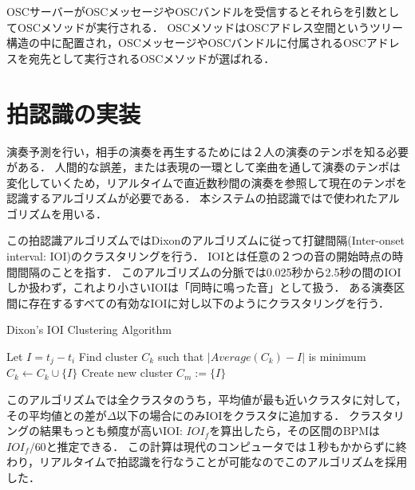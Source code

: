 OSCサーバーがOSCメッセージやOSCバンドルを受信するとそれらを引数としてOSCメソッドが実行される．
OSCメソッドはOSCアドレス空間というツリー構造の中に配置され，OSCメッセージやOSCバンドルに付属されるOSCアドレスを宛先として実行されるOSCメソッドが選ばれる．

\section{拍認識の実装}
演奏予測を行い，相手の演奏を再生するためには２人の演奏のテンポを知る必要がある．
人間的な誤差，または表現の一環として楽曲を通して演奏のテンポは変化していくため，リアルタイムで直近数秒間の演奏を参照して現在のテンポを認識するアルゴリズムが必要である．
本システムの拍認識では\cite{dixon:2000}で使われたアルゴリズムを用いる．

この拍認識アルゴリズムではDixonのアルゴリズム\cite{dixon}に従って打鍵間隔(Inter-onset interval: IOI)のクラスタリングを行う．
IOIとは任意の２つの音の開始時点の時間間隔のことを指す．
このアルゴリズムの分脈では0.025秒から2.5秒の間のIOIしか扱わず，これより小さいIOIは「同時に鳴った音」として扱う．
ある演奏区間に存在するすべての有効なIOIに対し以下のようにクラスタリングを行う．

\begin{algorithm}
  \caption{Dixon's IOI Clustering Algorithm}
\begin{algorithmic}[1]
        \State Let \( I = t_j - t_i \)
        \State Find cluster \( C_k \) such that \( | Average ( C_k ) - I | \) is minimum
            \State \( C_k \gets C_k \cup \{ I \} \)
        \Else
            \State Create new cluster \( C_m := \{ I \} \)
        \EndIf
    \EndIf
\EndFor
\end{algorithmic}
\end{algorithm}

このアルゴリズムでは全クラスタのうち，平均値が最も近いクラスタに対して，その平均値との差が\(\Delta\)以下の場合にのみIOIをクラスタに追加する．
クラスタリングの結果もっとも頻度が高いIOI: \begin{math}IOI_f\end{math}を算出したら，その区間のBPMは \begin{math}IOI_f/60\end{math}と推定できる．
この計算は現代のコンピュータでは１秒もかからずに終わり，リアルタイムで拍認識を行なうことが可能なのでこのアルゴリズムを採用した．

